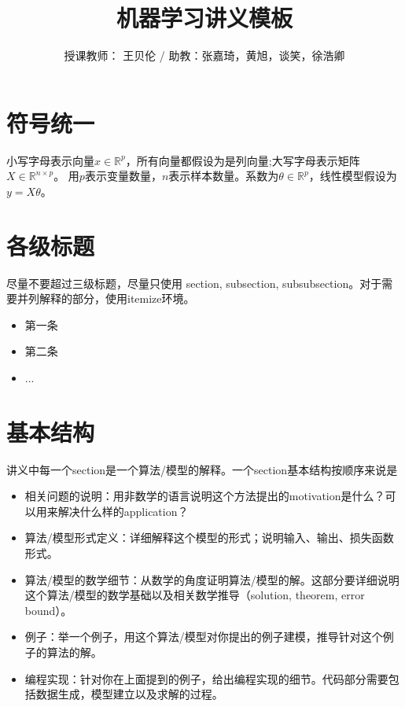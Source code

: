\documentclass[a4paper,9pt]{extarticle}
\title{机器学习讲义模板}
\author{授课教师： 王贝伦  /  助教：张嘉琦，黄旭，谈笑，徐浩卿}
\date{}
\begin{document}
\maketitle

\begin{multicols*}{2}
\section{符号统一}
小写字母表示向量$x \in \mathbb{R}^{p}$，所有向量都假设为是列向量;大写字母表示矩阵$X \in \mathbb{R}^{n \times p}$。
用$p$表示变量数量，$n$表示样本数量。系数为$\theta \in \mathbb{R}^p$，线性模型假设为$y = X\theta$。

\section{各级标题}
    尽量不要超过三级标题，尽量只使用 section, subsection, subsubsection。对于需要并列解释的部分，使用itemize环境。
    
    \begin{itemize}
        \item 第一条
        \item 第二条
        \item ...
    \end{itemize}
    
    
\section{基本结构}
    讲义中每一个section是一个算法/模型的解释。一个section基本结构按顺序来说是
    \begin{itemize}
        \item [(1)] 相关问题的说明：用非数学的语言说明这个方法提出的motivation是什么？可以用来解决什么样的application？
        \item [(2)] 算法/模型形式定义：详细解释这个模型的形式；说明输入、输出、损失函数形式。
        \item [(3)] 算法/模型的数学细节：从数学的角度证明算法/模型的解。这部分要详细说明这个算法/模型的数学基础以及相关数学推导（solution, theorem, error bound）。
        \item [(4)] 例子：举一个例子，用这个算法/模型对你提出的例子建模，推导针对这个例子的算法的解。
        \item [(5)]编程实现：针对你在上面提到的例子，给出编程实现的细节。代码部分需要包括数据生成，模型建立以及求解的过程。
    \end{itemize}


\end{multicols*}
\end{document}

